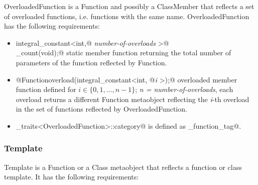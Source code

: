 {\metaobject OverloadedFunction} is a {\metaobject Function} and possibly a {\metaobject ClassMember}
that reflects a set of overloaded functions, i.e. functions with the same name.
{\metaobject OverloadedFunction} has the following requirements:

\begin{itemize}

	\item{\verb@static integral_constant<int,@ {\em number-of-overloads}
	\verb@>@\\\verb@overload_count(void);@} static member function returning the total number
	of parameters of the function reflected by {\metaobject Function}.

	\item{\verb@static @{\metaobject Function}\verb@ overload(integral_constant<int, @{\em i}
	\verb@>);@} overloaded member function defined
	for $i \in \{0, 1, \dots, n-1\}$; {\em n = number-of-overloads},
	each overload returns a different {\metaobject Function} metaobject reflecting the {\em i}-th overload
	in the set of functions reflected by {\metaobject OverloadedFunction}.

	\item \verb@metaobject_traits<OverloadedFunction>::category@ is defined as 
	\verb@overloaded_function_tag@.
\end{itemize}

\subsubsection{Template}

{\metaobject Template} is a {\metaobject Function} or a {\metaobject Class} metaobject
that reflects a function or class template. It has the following requirements:

